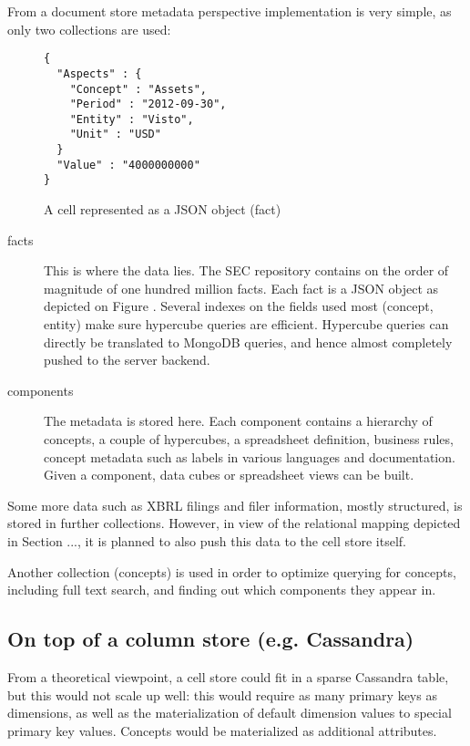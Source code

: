 \documentclass{acm_proc_article-sp}
\begin{document}
From a document store metadata perspective implementation is very simple, as only two collections are used:


\begin{figure}
\caption{A cell represented as a JSON object (fact)}
\label{fig-fact}
\begin{lstlisting}
{
  "Aspects" : {
    "Concept" : "Assets",
    "Period" : "2012-09-30",
    "Entity" : "Visto",
    "Unit" : "USD"
  }
  "Value" : "4000000000"
}
\end{lstlisting}
\end{figure}


\begin{description}
\item[facts] This is where the data lies. The SEC repository \cite{SECXBRL.info} contains on the order of magnitude of one hundred million facts. Each fact is a JSON object as depicted on Figure \label{fig-fact}. Several indexes on the fields used most (concept, entity) make sure hypercube queries are efficient. Hypercube queries can directly be translated to MongoDB queries, and hence almost completely pushed to the server backend.
\item[components] The metadata is stored here. Each component contains a hierarchy of concepts, a couple of hypercubes, a spreadsheet definition, business rules, concept metadata such as labels in various languages and documentation. Given a component, data cubes or spreadsheet views can be built.
\end{description}

Some more data such as XBRL filings and filer information, mostly structured, is stored in further collections. However, in view of the relational mapping depicted in Section ..., it is planned to also push this data to the cell store itself.

Another collection (concepts) is used in order to optimize querying for concepts, including full text search, and finding out which components they appear in.

\subsection{On top of a column store (e.g. Cassandra)}

From a theoretical viewpoint, a cell store could fit in a sparse Cassandra table, but this would not scale up well: this would require as many primary keys as dimensions, as well as the materialization of default dimension values to special primary key values. Concepts would be materialized as additional attributes.
\end{document}
